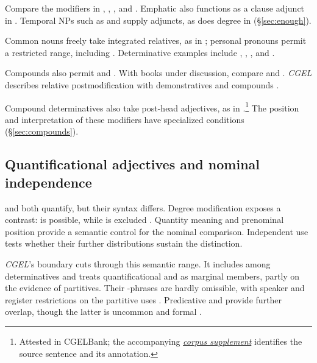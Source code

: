 \documentclass[12pt]{article}
\begin{document}
Compare the modifiers in , , , and . Emphatic  also functions as a clause adjunct in  \citep[1496--1497]{huddleston2002}. Temporal NPs such as  and  supply adjuncts, as does degree  in  (§\ref{sec:enough}).

Common nouns freely take integrated relatives, as in ; personal pronouns permit a restricted range, including  \citep[430]{huddleston2002}. Determinative examples include , , , and .

Compounds also permit  and . With books under discussion, compare  and . \textit{CGEL} describes relative postmodification with demonstratives and compounds \citep[414, 422--423]{huddleston2002}.

Compound determinatives also take post-head adjectives, as in .\footnote{Attested in CGELBank; the accompanying \href{run:corpus-documentation.pdf}{\textit{corpus supplement}} identifies the source sentence and its annotation.} The position and interpretation of these modifiers have specialized conditions (§\ref{sec:compounds}).

\subsection{Quantificational adjectives and nominal independence}\label{sec:quant-controls}

 and  both quantify, but their syntax differs. Degree modification exposes a contrast:  is possible, while  is excluded \citep[539--540]{huddleston2002}. Quantity meaning and prenominal position provide a semantic control for the nominal comparison. Independent use tests whether their further distributions sustain the distinction.

\textit{CGEL}'s boundary cuts through this semantic range. It includes  among determinatives and treats quantificational  and  as marginal members, partly on the evidence of partitives. Their -phrases are hardly omissible, with speaker and register restrictions on the partitive uses \citep[392--393, 411--413]{huddleston2002}. Predicative  and  provide further overlap, though the latter is uncommon and formal \citep[392, 395--396]{huddleston2002}.
\end{document}

